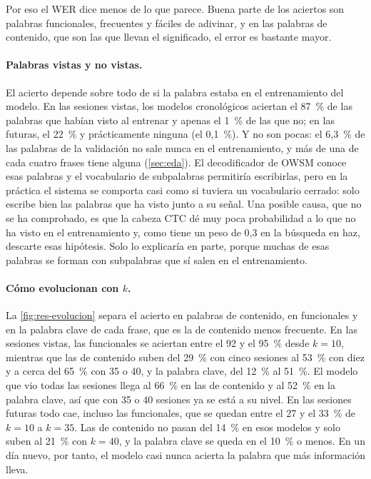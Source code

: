 Por eso el WER dice menos de lo que parece. Buena parte de los aciertos son palabras funcionales, frecuentes y fáciles de adivinar, y en las palabras de contenido, que son las que llevan el significado, el error es bastante mayor.

\paragraph{Palabras vistas y no vistas.} El acierto depende sobre todo de si la palabra estaba en el entrenamiento del modelo. En las sesiones vistas, los modelos cronológicos aciertan el 87~\% de las palabras que habían visto al entrenar y apenas el 1~\% de las que no; en las futuras, el 22~\% y prácticamente ninguna (el 0,1~\%). Y no son pocas: el 6,3~\% de las palabras de la validación no sale nunca en el entrenamiento, y más de una de cada cuatro frases tiene alguna (\cref{sec:eda}). El decodificador de OWSM conoce esas palabras y el vocabulario de subpalabras permitiría escribirlas, pero en la práctica el sistema se comporta casi como si tuviera un vocabulario cerrado: solo escribe bien las palabras que ha visto junto a su señal. Una posible causa, que no se ha comprobado, es que la cabeza CTC dé muy poca probabilidad a lo que no ha visto en el entrenamiento y, como tiene un peso de 0,3 en la búsqueda en haz, descarte esas hipótesis. Solo lo explicaría en parte, porque muchas de esas palabras se forman con subpalabras que sí salen en el entrenamiento.

\paragraph{Cómo evolucionan con $k$.} La \cref{fig:res-evolucion} separa el acierto en palabras de contenido, en funcionales y en la palabra clave de cada frase, que es la de contenido menos frecuente. En las sesiones vistas, las funcionales se aciertan entre el 92 y el 95~\% desde $k = 10$, mientras que las de contenido suben del 29~\% con cinco sesiones al 53~\% con diez y a cerca del 65~\% con 35 o 40, y la palabra clave, del 12~\% al 51~\%. El modelo que vio todas las sesiones llega al 66~\% en las de contenido y al 52~\% en la palabra clave, así que con 35 o 40 sesiones ya se está a su nivel. En las sesiones futuras todo cae, incluso las funcionales, que se quedan entre el 27 y el 33~\% de $k = 10$ a $k = 35$. Las de contenido no pasan del 14~\% en esos modelos y solo suben al 21~\% con $k = 40$, y la palabra clave se queda en el 10~\% o menos. En un día nuevo, por tanto, el modelo casi nunca acierta la palabra que más información lleva.

